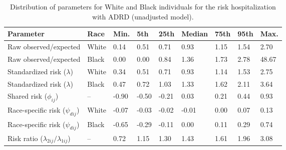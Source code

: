 \begin{table}[ht]
\centering
\begin{tabular}{lllllllll}
  \hline
Parameter & Race & Min. & 5th & 25th & Median & 75th & 95th & Max. \\ 
  \hline
Raw observed/expected & White &  0.14 &  0.51 &  0.71 &  0.93 & 1.15 & 1.54 &  2.70 \\ 
  Raw observed/expected & Black &  0.00 &  0.00 &  0.84 &  1.36 & 1.73 & 2.78 & 48.67 \\ 
  Standardized risk ($\lambda$) & White &  0.34 &  0.51 &  0.71 &  0.93 & 1.14 & 1.53 &  2.75 \\ 
  Standardized risk ($\lambda$) & Black &  0.47 &  0.72 &  1.03 &  1.33 & 1.62 & 2.11 &  3.64 \\ 
  Shared risk ($\phi_{ij}$) & -- & -0.90 & -0.50 & -0.21 &  0.03 & 0.21 & 0.44 &  0.93 \\ 
  Race-specific risk ($\psi_{dij}$) & White & -0.07 & -0.03 & -0.02 & -0.01 & 0.00 & 0.07 &  0.13 \\ 
  Race-specific risk ($\psi_{dij}$) & Black & -0.65 & -0.29 & -0.11 &  0.00 & 0.11 & 0.29 &  0.74 \\ 
  Risk ratio ($\lambda_{2ij}/\lambda_{1ij}$) & -- &  0.72 &  1.15 &  1.30 &  1.43 & 1.61 & 1.96 &  3.08 \\ 
   \hline
\end{tabular}
\caption{Distribution of parameters for White and Black individuals for the risk hospitalization with ADRD (unadjusted model).} 
\label{tab:summary_stats}
\end{table}
